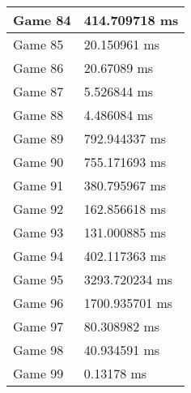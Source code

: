 \begin{tabular}{|l|l|}
	Game 84 & 414.709718 ms \\ \hline
	Game 85 & 20.150961 ms \\ \hline
	Game 86 & 20.67089 ms \\ \hline
	Game 87 & 5.526844 ms \\ \hline
	Game 88 & 4.486084 ms \\ \hline
	Game 89 & 792.944337 ms \\ \hline
	Game 90 & 755.171693 ms \\ \hline
	Game 91 & 380.795967 ms \\ \hline
	Game 92 & 162.856618 ms \\ \hline
	Game 93 & 131.000885 ms \\ \hline
	Game 94 & 402.117363 ms \\ \hline
	Game 95 & 3293.720234 ms \\ \hline
	Game 96 & 1700.935701 ms \\ \hline
	Game 97 & 80.308982 ms \\ \hline
	Game 98 & 40.934591 ms \\ \hline
	Game 99 & 0.13178 ms \\ \hline
\end{tabular}
